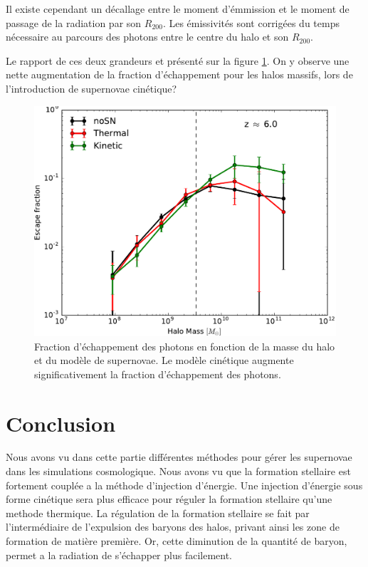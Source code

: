Il existe cependant un décallage entre le moment d'émmission et le moment de passage de la radiation par son $R_{200}$.
Les émissivités sont corrigées du temps nécessaire au parcours des photons entre le centre du halo et son $R_{200}$.

Le rapport de ces deux grandeurs et présenté sur la figure \ref{fig:fesc}.
On y observe une nette augmentation de la fraction d'échappement pour les halos massifs, lors de l'introduction de supernovae cinétique?


\begin{figure}
	\centering
	\includegraphics[width=.95\linewidth]{img/03/fesc.pdf} 
    \caption[Fraction d'échappement des photons]{Fraction d'échappement des photons en fonction de la masse du halo et du modèle de supernovae.
    Le modèle cinétique augmente significativement la fraction d'échappement des photons.
 	\label{fig:fesc}}
\end{figure}








\section{Conclusion}

Nous avons vu dans cette partie différentes méthodes pour gérer les supernovae dans les simulations cosmologique.
Nous avons vu que la formation stellaire est fortement couplée a la méthode d'injection d'énergie.
Une injection d'énergie sous forme cinétique sera plus efficace pour réguler la formation stellaire qu'une methode thermique.
La régulation de la formation stellaire se fait par l'intermédiaire de l'expulsion des baryons des halos, privant ainsi les zone de formation de matière première.
Or, cette diminution de la quantité de baryon, permet a la radiation de s'échapper plus facilement.

